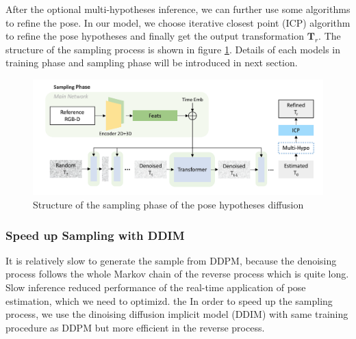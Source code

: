 \documentclass[12pt,DIV14,BCOR12mm,a4paper,footinclude=false,headinclude,parskip=half-,twoside,openright,cleardoublepage=empty,toc=index,bibliography=totoc,listof=totoc]{scrreprt}
\numberwithin{equation}{chapter}
\begin{document}
After the optional multi-hypotheses inference, we can further use some algorithms to refine the pose. In our model, we choose iterative closest point (ICP)\cite{121791} algorithm to refine the pose hypotheses and finally get the output transformation $\mathbf{T}_{r}$. The structure of the sampling process is shown in figure \ref{img:sample}. Details of each models in training phase and sampling phase will be introduced in next section.
\begin{figure}[h]
	\centering
	\includegraphics[scale=.23]{img/sample.png}
	\caption{Structure of the sampling phase of the pose hypotheses diffusion}
	\label{img:sample}
\end{figure}

\subsubsection{Speed up Sampling with DDIM}
It is relatively slow to generate the sample from DDPM, because the denoising process follows the whole Markov chain of the reverse process which is quite long. Slow inference reduced performance of the real-time application of pose estimation, which we need to optimizd. the In order to speed up the sampling process, we use the dinoising diffusion implicit model (DDIM)\cite{song2022denoising} with same training procedure as DDPM but more efficient in the reverse process.
\end{document}
